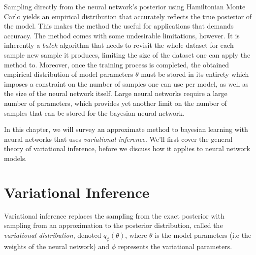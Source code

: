Sampling directly from the neural network's posterior using Hamiltonian Monte Carlo yields an empirical distribution
that accurately reflects the true posterior of the model. This makes the method the useful for applications that
demands accuracy.
The method comes with some undesirable limitations, however. 
It is inherently a \textit{batch} algorithm that needs to revisit the whole dataset for each sample new sample it produces,
limiting the size of the dataset one can apply the method to. Moreover, once the training process is completed, 
the obtained empirical distribution of model parameters $\theta$ must be stored in its entirety which imposes
a constraint on the number of samples one can use per model, as well as the size of the neural network itself. 
Large neural networks require a large number of parameters, which provides yet another limit on the number of samples
that can be stored for the bayesian neural network. 

In this chapter, we will survey an approximate method to bayesian learning with neural networks that
uses \textit{variational inference}. We'll first cover the general theory of variational inference,
before we discuss how it applies to neural network models. 

\section{Variational Inference}
Variational inference replaces the sampling from the exact posterior with sampling from an approximation to the posterior distribution,
called the \textit{variational distribution}, denoted $q_\phi(\theta)$, where $\theta$ is the model parameters (i.e the weights of the neural network) and $\phi$ represents the variational parameters.